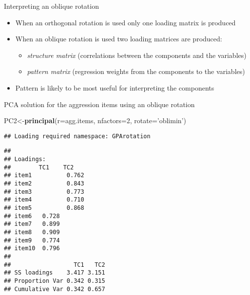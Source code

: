 \documentclass[
  ignorenonframetext,
]{beamer}
\newenvironment{Shaded}{\begin{snugshade}}{\end{snugshade}}
\newcommand{\DataTypeTok}[1]{\textcolor[rgb]{0.13,0.29,0.53}{#1}}
\newcommand{\DecValTok}[1]{\textcolor[rgb]{0.00,0.00,0.81}{#1}}
\newcommand{\KeywordTok}[1]{\textcolor[rgb]{0.13,0.29,0.53}{\textbf{#1}}}
\newcommand{\NormalTok}[1]{#1}
\newcommand{\OperatorTok}[1]{\textcolor[rgb]{0.81,0.36,0.00}{\textbf{#1}}}
\newcommand{\StringTok}[1]{\textcolor[rgb]{0.31,0.60,0.02}{#1}}
\providecommand{\tightlist}{%
  \setlength{\itemsep}{0pt}\setlength{\parskip}{0pt}}
\begin{document}
\begin{frame}{Interpreting an oblique rotation}
\protect\hypertarget{interpreting-an-oblique-rotation}{}

\begin{itemize}
\tightlist
\item
  When an orthogonal rotation is used only one loading matrix is
  produced
\item
  When an oblique rotation is used two loading matrices are produced:

  \begin{itemize}
  \tightlist
  \item
    \emph{structure matrix} (correlations between the components and the
    variables)
  \item
    \emph{pattern matrix} (regression weights from the components to the
    variables)
  \end{itemize}
\item
  Pattern is likely to be most useful for interpreting the components
\end{itemize}

\end{frame}

\begin{frame}[fragile]{PCA solution for the aggression items using an
oblique rotation}
\protect\hypertarget{pca-solution-for-the-aggression-items-using-an-oblique-rotation}{}

\begin{Shaded}
\begin{Highlighting}[]
\NormalTok{PC2<-}\KeywordTok{principal}\NormalTok{(}\DataTypeTok{r=}\NormalTok{agg.items, }\DataTypeTok{nfactors=}\DecValTok{2}\NormalTok{, }\DataTypeTok{rotate=}\StringTok{'oblimin'}\NormalTok{)}
\end{Highlighting}
\end{Shaded}

\begin{verbatim}
## Loading required namespace: GPArotation
\end{verbatim}

\begin{Shaded}
\end{Shaded}

\begin{verbatim}
## 
## Loadings:
##        TC1    TC2   
## item1          0.762
## item2          0.843
## item3          0.773
## item4          0.710
## item5          0.868
## item6   0.728       
## item7   0.899       
## item8   0.909       
## item9   0.774       
## item10  0.796       
## 
##                  TC1   TC2
## SS loadings    3.417 3.151
## Proportion Var 0.342 0.315
## Cumulative Var 0.342 0.657
\end{verbatim}

\end{frame}
\end{document}
